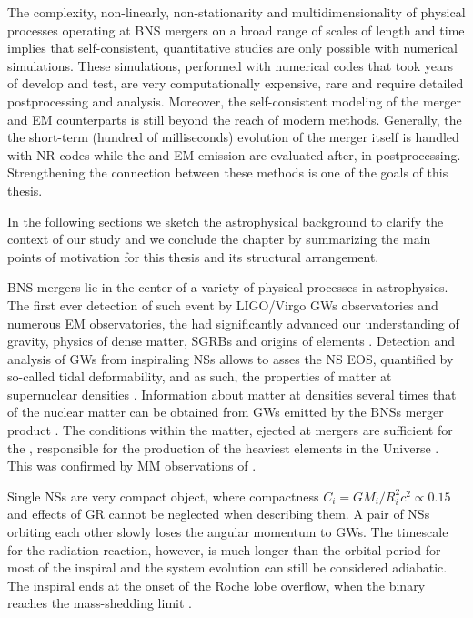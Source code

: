 The complexity, non-linearly, non-stationarity and multidimensionality of physical 
processes operating at \ac{BNS} mergers on a broad range of scales of length and time 
implies that self-consistent, quantitative studies are only possible with numerical 
simulations. These simulations, performed with numerical codes that took years of 
develop and test, are very computationally expensive, rare and require detailed 
postprocessing and analysis. Moreover, the self-consistent modeling of the merger and 
\ac{EM} counterparts is still beyond the reach of modern methods. Generally, the 
the short-term (hundred of milliseconds) evolution of the merger itself 
is handled with \ac{NR} codes while the \nuc{} and \ac{EM} emission are evaluated 
after, in postprocessing. Strengthening the connection between these methods is one of 
the goals of this thesis. 

In the following sections we sketch the astrophysical background to clarify the 
context of our study and we conclude the chapter by summarizing the main points of 
motivation for this thesis and its structural arrangement.


\ac{BNS} mergers lie in the center of a variety of physical processes in astrophysics.
The first ever detection of such event by LIGO/Virgo \acp{GW} observatories and 
numerous \ac{EM} observatories, the \GW{} had significantly advanced our understanding 
of gravity, physics of dense matter, \acp{SGRB} and origins of \rproc{} elements 
\cite{1,2,3}. 
%
Detection and analysis of \acp{GW} from inspiraling \acp{NS} allows to asses 
the \ac{NS} \ac{EOS}, quantified by so-called tidal deformability, and as such, the 
properties of matter at supernuclear densities \cite{5,6,7}. Information about matter 
at densities several times that of the nuclear matter 
can be obtained from \acp{GW} emitted by the \acp{BNS} merger product \cite{8,9,10,11}. 
%
The conditions within the matter, ejected at mergers are sufficient for the \rproc{} 
\nuc{}, responsible for the production of the heaviest elements in the Universe
\cite{12}. This was confirmed by \ac{MM} observations of \GW{} \cite{12}. 

Single \acp{NS} are very compact object, where compactness 
$C_{i} = GM_i/R_i^2c^2\propto0.15$ and effects of \ac{GR} cannot be neglected 
when describing them. A pair of \acp{NS} orbiting each other slowly loses the 
angular momentum to \acp{GW}. The timescale for the radiation reaction, however, 
is much longer than the orbital period for most of the inspiral and the 
system evolution can still be considered adiabatic. 
The inspiral ends at the onset of the Roche lobe overflow, when the binary 
reaches the mass-shedding limit \cite{13}.

